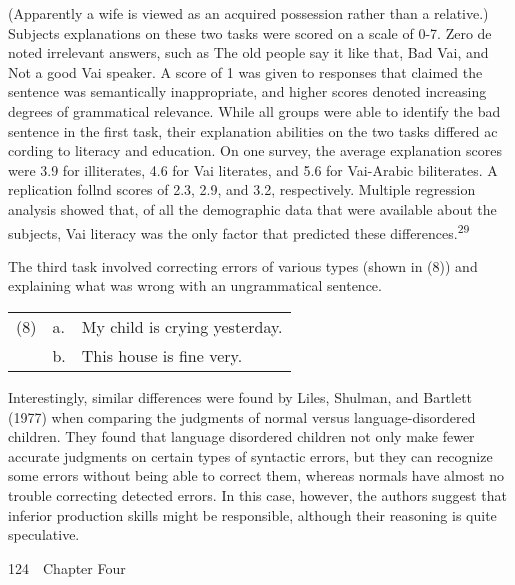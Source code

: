 \begin{styleStandard}
(Apparently a wife is viewed as an acquired possession rather than a relative.) Subjects{\textquotesingle} explanations on these two tasks were scored on a scale of 0-7. Zero de\- noted irrelevant answers, such as {\textquotedbl}The old people say it like that,{\textquotedbl} {\textquotedbl}Bad Vai,{\textquotedbl} and {\textquotedbl}Not a good Vai speaker.{\textquotedbl} A score of 1 was given to responses that claimed the sentence was semantically inappropriate, and higher scores denoted increasing degrees of grammatical relevance. While all groups were able to identify the bad sentence in the first task, their explanation abilities on the two tasks differed ac\- cording to literacy and education. On one survey, the average explanation scores were 3.9 for illiterates, 4.6 for Vai literates, and 5.6 for Vai-Arabic biliterates. A replication follnd scores of 2.3, 2.9, and 3.2, respectively. Multiple regression analysis showed that, of all the demographic data that were available about the subjects, Vai literacy was the only factor that predicted these differences.\textsuperscript{29}
\end{styleStandard}


\begin{styleStandard}
The third task involved correcting errors of various types (shown in (8)) and explaining what was wrong with an ungrammatical sentence.
\end{styleStandard}


\begin{flushleft}
\tablehead{}
\begin{supertabular}{m{0.20185986in}m{0.22545984in}m{1.6823599in}}
(8)

 &
a.

 &
My child is crying yesterday.

\\
 &
b.

 &
This house is fine very.

\\
\end{supertabular}
\end{flushleft}
\begin{listWWNumxxxviileveli}
\item 
\begin{styleStandard}
Interestingly, similar differences were found by Liles, Shulman, and Bartlett (1977) when comparing the judgments of normal versus language-disordered children. They found that language\- disordered children not only make fewer accurate judgments on certain types of syntactic errors, but they can recognize some errors without being able to correct them, whereas normals have almost no trouble correcting detected errors. In this case, however, the authors suggest that inferior production skills might be responsible, although their reasoning is quite speculative.
\end{styleStandard}


\end{listWWNumxxxviileveli}
\clearpage\setcounter{page}{1}\begin{styleStandard}
124\ \ Chapter Four
\end{styleStandard}


